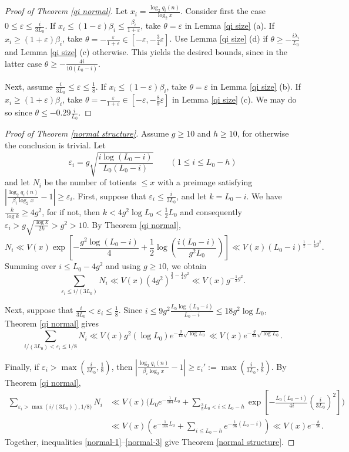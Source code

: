 \documentclass[11pt]{amsart}
\theoremstyle{remark}
\theoremstyle{plain}
\numberwithin{equation}{section}
\newcommand{\be}{\begin{equation}}
\newcommand{\ee}{\end{equation}}
\newcommand{\lam}{\ensuremath{\lambda}}
\renewcommand{\b}{\ensuremath{\beta}}
\newcommand{\eps}{\ensuremath{\varepsilon}}
\newcommand{\e}{\ensuremath{\varepsilon}}
\renewcommand{\(}{\left(}
\renewcommand{\)}{\right)}
\newcommand{\pfrac}[2]{\left(\frac{#1}{#2}\right)}
\renewcommand{\le}{\leqslant}
\renewcommand{\ge}{\geqslant}
\renewcommand{\th}{\ensuremath{\theta}}
\begin{document}
\begin{proof}[Proof of Theorem \ref{qi normal}]
Let $x_i=\frac{\log_2 q_i(n)}{\log_2 x}$.
Consider first the case $0\le \eps \le \frac{i}{3L_0}$.
If $x_i\le (1-\eps)\b_i \le \frac{\b_i}{1+\eps}$, take $\th=\eps$ in Lemma \ref{qi size} (a).
If $x_i\ge (1+\eps)\b_i$, take $\th=-\frac{\eps}{1+\eps}\in [-\eps,-\frac34 \eps]$.
Use  Lemma \ref{qi size} (d) if $\th \ge -\frac{i\lam_i}{L_0}$ and  Lemma \ref{qi size} (c)
otherwise.  This yields the desired bounds, since in the latter case $\th \ge -\frac{4i}
{10(L_0-i)}$.

Next, assume $\frac{i}{3L_0} \le \eps \le \frac18$. 
If $x_i\le (1-\eps)\b_i$, take $\th=\eps$ in  Lemma \ref{qi size} (b).  If $x_i\ge (1+\eps)\b_i$,
take $\th=-\frac{\eps}{1+\eps}\in [-\eps,-\frac89 \eps]$ in Lemma \ref{qi size} (c).
We may do so since $\th \le -0.29 \frac{i}{L_0}$.
\end{proof}





\begin{proof}[Proof of Theorem \ref{normal structure}]
Assume $g\ge 10$ and $h\ge 10$, for otherwise
the conclusion is trivial.  Let
$$
\e_i = g \sqrt{\frac{i\log(L_0-i)}{L_0(L_0-i)}} \qquad (1\le i\le L_0-h)
$$
and let $N_i$ be the number of totients $\le x$ with a preimage satisfying
$|\frac{\log_2 q_i(n)}{\b_i\log_2 x} - 1| \ge \eps_i$.
First, suppose that $\eps_i \le \frac{i}{3L_0}$, and let $k=L_0-i$.
We have $\frac{k}{\log k} \ge 4g^2$, for if not, then $k<4g^2\log L_0 < \frac12 L_0$
and consequently $\eps_i > g\sqrt{\frac{\log k}{2k}} > g^2 > 10$.  By Theorem
\ref{qi normal},
\[
 N_i \ll V(x) \exp \left[ - \frac{g^2 \log (L_0-i)}{4} + \frac12 \log\pfrac{i(L_0-i)}{g^2 L_0}
\right] \ll V(x) (L_0-i)^{\frac12-\frac14 g^2}.
\]
Summing over $i\le L_0-4g^2$ and using $g\ge 10$, we obtain
\be\label{normal-1}
\sum_{\eps_i\le i/(3L_0)} N_i \ll V(x) (4g^2)^{\frac32 - \frac14 g^2} \ll V(x) g^{-\frac12 g^2}.
\ee

Next, suppose that $\frac{i}{3L_0} < \eps_i \le \frac18$.  
Since $i \le 9g^2 \frac{L_0 \log(L_0-i)}{L_0-i} \le 18g^2\log L_0$, 
Theorem \ref{qi normal} gives
\be\label{normal-2}
\sum_{i/(3L_0)<\eps_i\le 1/8} N_i \ll V(x) g^2 (\log L_0) e^{-\frac{g}{13}\sqrt{\log L_0}}
\ll V(x) e^{-\frac{g}{14}\sqrt{\log L_0}}.
\ee

Finally, if $\eps_i>\max(\frac{i}{3L_0},\frac18)$, then
$|\frac{\log_2 q_i(n)}{\b_i\log_2 x} - 1| \ge \eps_i' := \max(\frac{i}{3L_0},\frac18)$.  By Theorem \ref{qi normal},
\be\label{normal-3}
\begin{split}
\sum_{\eps_i>\max(i/(3L_0)),1/8)} N_i &\ll V(x) \Bigg( L_0 e^{-\frac{1}{104}L_0} +
\sum_{\frac38L_0<i\le L_0-h} \exp\left[ - \frac{L_0(L_0-i)}{4i}\pfrac{i}{3L_0}^2\right] \Bigg)\\
&\ll V(x) \( e^{-\frac{1}{105}L_0} + \sum_{i\le L_0-h} e^{-\frac{1}{96}(L_0-i)} \)
\ll V(x) e^{-\frac{h}{96}}.
\end{split}\ee
Together, inequalities \eqref{normal-1}--\eqref{normal-3} give Theorem \ref{normal structure}.
\end{proof}
\end{document}
